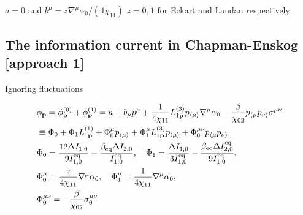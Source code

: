 \documentclass[aps,prd,preprint,nofootinbib,amsmath,amssymb,showpacs,longbibliography,singlecolumn,superscriptaddress,10pt]{revtex4-1}
\theoremstyle{plain}
\theoremstyle{definition}
\begin{document}
$a=0$ and $b^\mu=z\nabla^\mu \alpha_{0} / (4\chi_{11})$ $z = 0,1$ for Eckart and Landau respectively



\subsection{The information current in Chapman-Enskog [approach 1]}

Ignoring fluctuations

\begin{equation}
\begin{aligned}
&
\phi_{\mathbf{p}} = \phi_{\mathbf{p}}^{(0)} + \phi_{\mathbf{p}}^{(1)} 
=
a + b_\mu p^\mu + \frac{1}{4\chi_{11}}L^{(3)}_{1\mathbf{p}}p_{\langle\mu\rangle}\nabla ^{\mu }\alpha_{0} -\frac{\beta}{\chi_{02}} 
p_{\langle \mu }p_{\nu \rangle}
\sigma^{\mu \nu }    
\\
&
\equiv
\Phi_{0} 
+
\Phi_{1} L^{(1)}_{1 {\bf p}}
+
\Phi_{0}^{\mu} p_{\langle \mu \rangle} 
+
\Phi_{1}^{\mu} 
L^{(3)}_{1 {\bf p}} p_{\langle \mu \rangle}
+
\Phi_{0}^{\mu \nu} p_{\langle \mu} p_{ \nu \rangle} 
\\
&
\Phi_{0} = \frac{12 \Delta I_{1,0}}{9 I_{1,0}^{\mathrm{eq}}} 
- 
\frac{\beta_{\mathrm{eq}} \Delta I_{2,0}}{I_{1,0}^{\mathrm{eq}}}, \quad
\Phi_{1} = 
\frac{\Delta I_{1,0}}{3 I_{1,0}^{\mathrm{eq}}} 
- 
\frac{\beta_{\mathrm{eq}} \Delta I_{2,0}^{\mathrm{eq}}}{9I_{1,0}^{\mathrm{eq}}},
\\
&
\Phi_{0}^{\mu} = \frac{z}{4\chi_{11}} \nabla^\mu \alpha_{0} , \quad
\Phi_{1}^{\mu} = \frac{1}{4\chi_{11}}\nabla ^{\mu }\alpha_{0},
\\
&
\Phi_{0}^{\mu \nu} = -\frac{\beta}{\chi_{02}} 
\sigma^{\mu \nu }_{0}    
\end{aligned}    
\end{equation}
\end{document}
